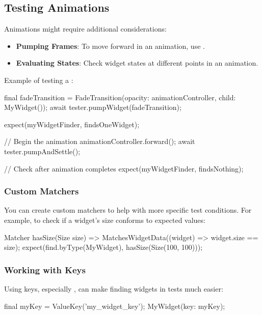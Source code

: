 \subsection*{Testing Animations}

Animations might require additional considerations:

\begin{itemize}
 \item \textbf{Pumping Frames}: To move forward in an animation, use .
 \item \textbf{Evaluating States}: Check widget states at different points in an animation.
\end{itemize}

Example of testing a :

\begin{dartcode}
final fadeTransition = FadeTransition(opacity: animationController, child: MyWidget());
await tester.pumpWidget(fadeTransition);

expect(myWidgetFinder, findsOneWidget);

// Begin the animation
animationController.forward();
await tester.pumpAndSettle();

// Check after animation completes
expect(myWidgetFinder, findsNothing);
\end{dartcode}

\subsubsection*{Custom Matchers}

You can create custom matchers to help with more specific test conditions. For example, to check if a widget's size conforms to expected values:

\begin{dartcode}
Matcher hasSize(Size size) => MatchesWidgetData((widget) => widget.size == size);
expect(find.byType(MyWidget), hasSize(Size(100, 100)));
\end{dartcode}

\subsubsection*{Working with Keys}

Using keys, especially , can make finding widgets in tests much easier:

\begin{dartcode}
final myKey = ValueKey('my_widget_key');
MyWidget(key: myKey);
\end{dartcode}

